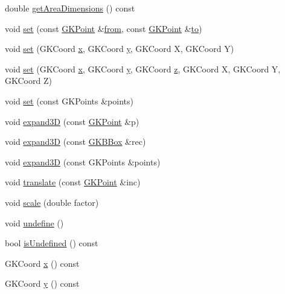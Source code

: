 \begin{DoxyCompactItemize}
\item 
double \hyperlink{classGKBBox_a517343b18cb19420be70ff1cbad84724}{get\+Area\+Dimensions} () const 
\item 
void \hyperlink{classGKBBox_afd1d34ca5fd9321a5e3eba22fb79f087}{set} (const \hyperlink{classGKPoint}{G\+K\+Point} \&\hyperlink{classGKBBox_aa5b512feaacc7fab5aa6e84bbe6f106f}{from}, const \hyperlink{classGKPoint}{G\+K\+Point} \&\hyperlink{classGKBBox_af0ec176a4cfaa7731b39858cbb88d6db}{to})
\item 
void \hyperlink{classGKBBox_a8590b3edcf262ffef586b917a1bd1b1c}{set} (G\+K\+Coord \hyperlink{classGKBBox_ac607e63172143a23c6c2dfd89a13d1d0}{x}, G\+K\+Coord \hyperlink{classGKBBox_a1e3d663358c16956585b9ef44131fd26}{y}, G\+K\+Coord X, G\+K\+Coord Y)
\item 
void \hyperlink{classGKBBox_a982ad5e8995a1fad7d08020c578c45ae}{set} (G\+K\+Coord \hyperlink{classGKBBox_ac607e63172143a23c6c2dfd89a13d1d0}{x}, G\+K\+Coord \hyperlink{classGKBBox_a1e3d663358c16956585b9ef44131fd26}{y}, G\+K\+Coord \hyperlink{classGKBBox_ae36232dda9ccdec81abaa8ebc009ccd7}{z}, G\+K\+Coord X, G\+K\+Coord Y, G\+K\+Coord Z)
\item 
void \hyperlink{classGKBBox_a4fe74afcb0b32afa738673ac761f5b6d}{set} (const G\+K\+Points \&points)
\item 
void \hyperlink{classGKBBox_ae50cbcbc60808351af8d9706b95f0940}{expand3D} (const \hyperlink{classGKPoint}{G\+K\+Point} \&p)
\item 
void \hyperlink{classGKBBox_a6a778e6cae7b7d2dbccf4789b9a7dccb}{expand3D} (const \hyperlink{classGKBBox}{G\+K\+B\+Box} \&rec)
\item 
void \hyperlink{classGKBBox_ac4f8eed51dd83bee955f383d051a155e}{expand3D} (const G\+K\+Points \&points)
\item 
void \hyperlink{classGKBBox_a04e66e0838cb073e1b3bc18e7d6c79a2}{translate} (const \hyperlink{classGKPoint}{G\+K\+Point} \&inc)
\item 
void \hyperlink{classGKBBox_a0d937ae05237d8df865a1371295d765a}{scale} (double factor)
\item 
void \hyperlink{classGKBBox_a2965a2bd67a7e06d8e45b3147892aa16}{undefine} ()
\item 
bool \hyperlink{classGKBBox_ade515a944ff5e97371e787c4dde2d2cc}{is\+Undefined} () const 
\item 
G\+K\+Coord \hyperlink{classGKBBox_ac607e63172143a23c6c2dfd89a13d1d0}{x} () const 
\item 
G\+K\+Coord \hyperlink{classGKBBox_a1e3d663358c16956585b9ef44131fd26}{y} () const 

\end{DoxyCompactItemize}
